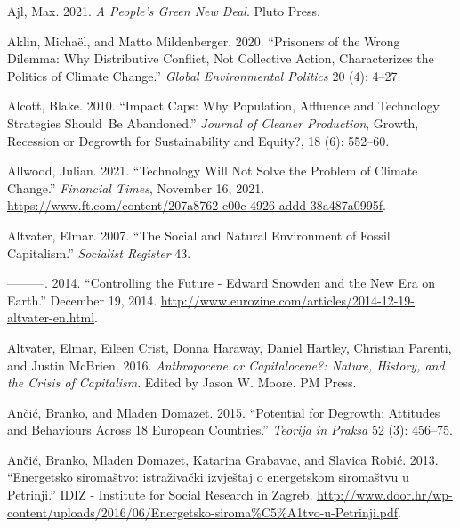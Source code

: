 \documentclass[a4paper, nobind]{templates/ociamthesis}
\newlength{\cslhangindent}
\newenvironment{CSLReferences}[2] %
 {%
  \setlength{\parindent}{0pt}
  \ifodd #1
  \let\oldpar\par
  \def\par{\hangindent=\cslhangindent\oldpar}
  \fi
  \setlength{\parskip}{1mm}
  \setlength{\baselineskip}{6mm}
 }%
 {}
\begin{document}
\hypertarget{refs}{}
\begin{CSLReferences}{1}{0}
\leavevmode{}%
Ajl, Max. 2021. \emph{A {People}'s {Green New Deal}}. {Pluto Press}.

\leavevmode{}%
Aklin, Michaël, and Matto Mildenberger. 2020. {``Prisoners of the {Wrong Dilemma}: {Why Distributive Conflict}, {Not Collective Action}, {Characterizes} the {Politics} of {Climate Change}.''} \emph{Global Environmental Politics} 20 (4): 4--27.

\leavevmode{}%
Alcott, Blake. 2010. {``Impact Caps: Why Population, Affluence and Technology Strategies Should~Be Abandoned.''} \emph{Journal of Cleaner Production}, Growth, {Recession} or {Degrowth} for {Sustainability} and {Equity}?, 18 (6): 552--60.

\leavevmode{}%
Allwood, Julian. 2021. {``Technology Will Not Solve the Problem of Climate Change.''} \emph{Financial Times}, November 16, 2021. \url{https://www.ft.com/content/207a8762-e00c-4926-addd-38a487a0995f}.

\leavevmode{}%
Altvater, Elmar. 2007. {``The Social and Natural Environment of Fossil Capitalism.''} \emph{Socialist Register} 43.

\leavevmode{}%
---------. 2014. {``Controlling the Future - {Edward Snowden} and the New Era on {Earth}.''} December 19, 2014. \url{http://www.eurozine.com/articles/2014-12-19-altvater-en.html}.

\leavevmode{}%
Altvater, Elmar, Eileen Crist, Donna Haraway, Daniel Hartley, Christian Parenti, and Justin McBrien. 2016. \emph{Anthropocene or {Capitalocene}?: {Nature}, {History}, and the {Crisis} of {Capitalism}}. Edited by Jason W. Moore. {PM Press}.

\leavevmode{}%
Ančić, Branko, and Mladen Domazet. 2015. {``Potential for Degrowth: Attitudes and Behaviours Across 18 {European} Countries.''} \emph{Teorija in Praksa} 52 (3): 456--75.

\leavevmode{}%
Ančić, Branko, Mladen Domazet, Katarina Grabavac, and Slavica Robić. 2013. {``Energetsko siromaštvo: istraživački izvještaj o energetskom siromaštvu u Petrinji.''} {IDIZ - Institute for Social Research in Zagreb}. \url{http://www.door.hr/wp-content/uploads/2016/06/Energetsko-siroma\%C5\%A1tvo-u-Petrinji.pdf}.


\end{CSLReferences}
\end{document}
